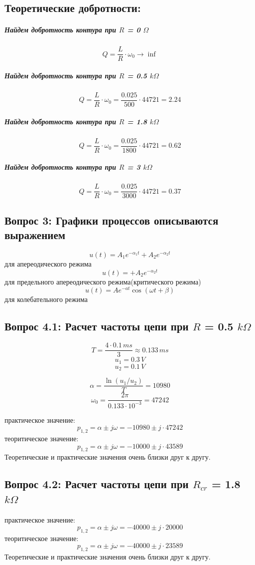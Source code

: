 \documentclass[a4paper,12pt]{report}
\begin{document}
\begin{flushleft}
\newpage
\subsection*{Теоретические добротности: }
\subparagraph*{Найдем добротность контура при $R$ = 0 $\Omega$}
\[ Q = \frac{L}{R} \cdot \omega_0 \longrightarrow \inf \]

\subparagraph*{Найдем добротность контура при $R$ = 0.5 $k\Omega$}
\[ Q = \frac{L}{R} \cdot \omega_0 = \frac{0.025}{500}\cdot 44721 = 2.24 \]

\subparagraph*{Найдем добротность контура при $R$ = 1.8 $k\Omega$}
\[ Q = \frac{L}{R} \cdot \omega_0 = \frac{0.025}{1800}\cdot 44721 = 0.62 \]

\subparagraph*{Найдем добротность контура при $R$ = 3 $k\Omega$}
\[ Q = \frac{L}{R} \cdot \omega_0 = \frac{0.025}{3000}\cdot 44721 = 0.37 \]
  
  \newpage

  \subsection*{Вопрос 3: Графики процессов описываются выражением}
  \[ u(t) = A_1e^{-\alpha_1 t} + A_2e^{-\alpha_2 t}\] для апереодического режима
  \[ u(t) =  + A_2e^{-\alpha_2 t}\] для предельного апереодического режима(критического режима)
  \[ u(t) = Ae^{-at}\cos(\omega t + \beta)\] для колебательного режима
	
  \subsection*{Вопрос 4.1: Расчет частоты цепи при $R$ = 0.5 $k\Omega$}
  \[ T = \frac{4\cdot 0.1 \, ms}{3 } \approx 0.133 \, ms \]
  \[ u_1 = 0.3 \, V \]
  \[ u_2 = 0.1 \, V \]

  \[ \alpha = \frac{\ln(u_1/u_2)}{T} = 10980 \]
  \[ \omega_0 = \frac{2 \pi}{0.133\cdot 10^{-3}} = 47242 \]

  практическое значение:
  \[ p_{1,2} = \alpha \pm j\omega = -10980 \pm j\cdot47242\]
  теоритическое значение:
  \[ p_{1,2} = \alpha \pm j\omega = -10000 \pm j\cdot43589\]
  Теоретические и практические значения очень близки друг к другу.

  \subsection*{Вопрос 4.2: Расчет частоты цепи при $R_{cr}$ = 1.8 $k\Omega$}
  
  практическое значение:
  \[ p_{1,2} = \alpha \pm j\omega = -40000 \pm j\cdot 20000\]
  теоритическое значение:
  \[ p_{1,2} = \alpha \pm j\omega = -40000 \pm j\cdot 23589\]
  Теоретические и практические значения очень близки друг к другу.


\end{flushleft}
\end{document}
